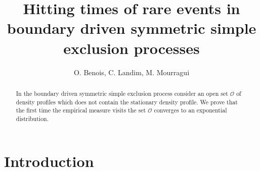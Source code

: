 \documentclass[reqno]{amsart}
\begin{document}
\title[Hitting times of rare events in BDSSEP]
{Hitting times of rare events in boundary driven
  symmetric simple exclusion processes}

\author{O. Benois, C. Landim, M. Mourragui}

\address{\noindent CNRS UMR 6085, Universit\'e de Rouen, Avenue de
  l'Universit\'e, BP.12, Technop\^ole du Madril\-let, F76801
  Saint-\'Etienne-du-Rouvray, France.  \newline e-mail: \rm
  \texttt{olivier.benois@univ-rouen.fr} }

\address{\noindent IMPA, Estrada Dona Castorina 110, CEP 22460 Rio de
  Janeiro, Brasil.  \newline e-mail: \rm
  \texttt{brunog@impa.br} }

\address{\noindent IMPA, Estrada Dona Castorina 110, CEP 22460 Rio de
  Janeiro, Brasil and CNRS UMR 6085, Universit\'e de Rouen, Avenue de
  l'Universit\'e, BP.12, Technop\^ole du Madril\-let, F76801
  Saint-\'Etienne-du-Rouvray, France.  \newline e-mail: \rm
  \texttt{landim@impa.br} }

\address{\noindent CNRS UMR 6085, Universit\'e de Rouen, Avenue de
  l'Universit\'e, BP.12, Technop\^ole du Madril\-let, F76801
  Saint-\'Etienne-du-Rouvray, France.  \newline e-mail: \rm
  \texttt{mustapha.mourragui@univ-rouen.fr} }


\begin{abstract}
  In the boundary driven symmetric simple exclusion process consider
  an open set ${{\mathscr O}}$ of density profiles which does not contain the
  stationary density profile. We prove that the first time the
  empirical measure visits the set ${{\mathscr O}}$ converges to an exponential
  distribution.
\end{abstract}

\maketitle

\section{Introduction}
\label{sec0}
\end{document}
